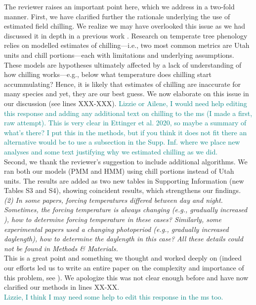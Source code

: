 \documentclass[11pt]{article}
\begin{document}
The reviewer raises an important point here, which we address in a two-fold manner. First, we have clarified further the rationale underlying the use of estimated field chilling. We realize we may have overlooked this issue as we had discussed it in depth in a previous work \citep{ettinger2020}. Research on temperate tree phenology relies on modelled estimates of chilling---i.e., two most common metrics are Utah units and chill portions---each with limitations and underlying assumptions. These models are hypotheses ultimately affected by a lack of understanding of how chilling works---e.g., below what temperature does chilling start accummulating? Hence, it is likely that estimates of chilling are inaccurate for many species and yet, they are our best guess. We now elaborate on this issue in our discussion (see lines XXX-XXX).
\textcolor{teal}{Lizzie or Ailene, I would need help editing this response and adding any additional text on chilling to the ms (I made a first, raw attempt). This is very clear in Ettinger et al. 2020, so maybe a summary of what's there? I put this in the methods, but if you think it does not fit there an alternative would be to use a subsection in the Supp. Inf. where we place new analyses and some text justifying why we estimated chilling as we did.}\\

Second, we thank the reviewer's suggestion to include additional algorithms. We ran both our models (PMM and HMM) using chill portions instead of Utah units. The results are added as two new tables in Supporting Information (new Tables S3 and S4), showing coincident results, which strengthens our findings.\\  


\emph{(2) In some papers, forcing temperatures differed between day and night. Sometimes, the forcing temperature is always changing (e.g., gradually increased ), how to determine forcing temperature in these cases? Similarly, some experimental papers used a changing photoperiod (e.g., gradually increased daylength), how to determine the daylength in this case? All these details could not be found in Methods \& Materials.}\\

This is a great point and something we thought and worked deeply on (indeed our efforts led us to write an entire paper on the complexity and importance of this problem, see ). We apologize this was not clear enough before and have now clarified our methods in lines XX-XX.  \\
\textcolor{teal}{Lizzie, I think I may need some help to edit this response in the ms too.}\\
\end{document}
